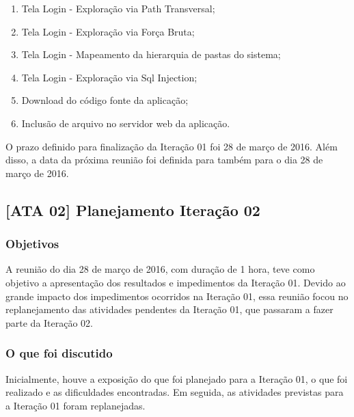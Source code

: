 \documentclass[
    12pt,               %
    openright,          %
    oneside,            %
    a4paper,            %
    section=TITLE,     %
    english,            %
    french,             %
    spanish,            %
    brazil              %
    ]{abntex2}
\begin{document}
\begin{enumerate}[start=1]
	
\item Tela Login - Exploração via Path Transversal;
	
\item Tela Login - Exploração via Força Bruta;
	
\item Tela Login - Mapeamento da hierarquia de pastas do sistema;
	
\item Tela Login - Exploração via Sql Injection;
	
\item Download do código fonte da aplicação;
	
\item Inclusão de arquivo no servidor web da aplicação.

\end{enumerate}

O prazo definido para finalização da Iteração 01 foi 28 de março de 2016. Além disso, a data da próxima reunião foi definida para também para o dia 28 de março de 2016.



\subsection*{{[}ATA 02{]} Planejamento Iteração 02}


\subsubsection*{Objetivos}

A reunião do dia 28 de março de 2016, com duração de 1 hora, teve como objetivo a apresentação dos resultados e impedimentos da Iteração 01. Devido ao grande impacto dos impedimentos ocorridos na Iteração 01, essa reunião focou no replanejamento das atividades pendentes da Iteração 01, que passaram a fazer parte da Iteração 02.



\subsubsection*{O que foi discutido}

Inicialmente, houve a exposição do que foi planejado para a Iteração 01, o que foi realizado e as dificuldades encontradas. Em seguida, as atividades previstas para a Iteração 01 foram replanejadas.
\end{document}
